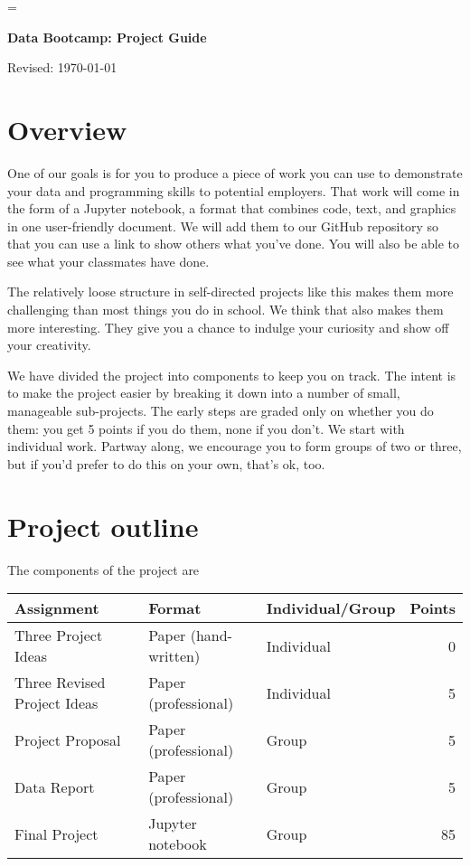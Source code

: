 \documentclass[11pt]{article}
\begin{document}
\parskip=\bigskipamount
\parindent=0.0in
\thispagestyle{empty}


\bigskip\bigskip
\centerline{\Large \bf Data Bootcamp:  Project Guide}
\centerline{Revised: \today}

\section*{Overview}

One of our goals is for you to produce a piece of work you can use
to demonstrate your data and programming skills to potential employers.
That work will come in the form of a Jupyter notebook,
a format that combines code, text, and graphics in one user-friendly document.
We will add them to our GitHub repository so that
you can use a link to show others what you've done.
You will also be able to see what your classmates have done.

The relatively loose structure in self-directed projects like this
makes them more challenging than most things you do in school.
We think that also makes them more interesting.
They give you a chance to
indulge your curiosity and show off your creativity.

We have divided the project into components to keep you on track.
The intent is to make the project easier by breaking it down into a number
of small, manageable sub-projects.
The early steps are graded only on whether you do them:
you get 5 points if you do them, none if you don't.
We start with individual work.  Partway along, we encourage you to form groups
of two or three, but if you'd prefer to do this on your own,
that's ok, too.


\section*{Project outline}

The components of the project are
%
\begin{center}
\begin{tabular}{lllr}
\toprule
Assignment                  & Format  & Individual/Group &  Points \\
\midrule
Three Project Ideas         & Paper (hand-written)  & Individual  & 0  \\
Three Revised Project Ideas & Paper (professional)  & Individual  & 5  \\
Project Proposal            & Paper (professional)  & Group       & 5  \\
Data Report                 & Paper (professional)  & Group       & 5  \\
Final Project               & Jupyter notebook      & Group       & 85 \\
\bottomrule
\end{tabular}
\end{center}
\end{document}
